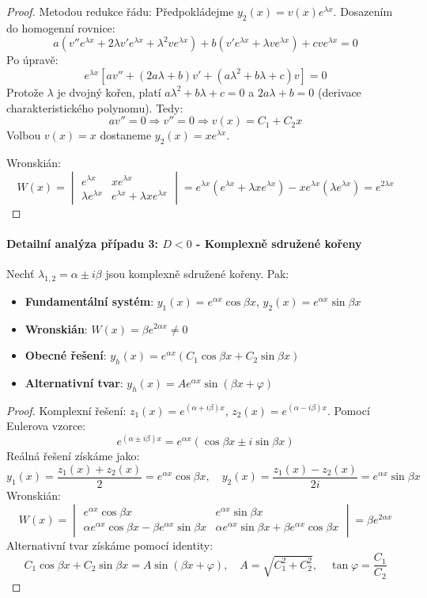 \begin{proof}
Metodou redukce řádu: Předpokládejme $y_2(x) = v(x)e^{\lambda x}$. Dosazením do homogenní rovnice:
\[
a(v''e^{\lambda x} + 2\lambda v'e^{\lambda x} + \lambda^2 ve^{\lambda x}) + b(v'e^{\lambda x} + \lambda ve^{\lambda x}) + cve^{\lambda x} = 0
\]
Po úpravě:
\[
e^{\lambda x}[av'' + (2a\lambda + b)v' + (a\lambda^2 + b\lambda + c)v] = 0
\]
Protože $\lambda$ je dvojný kořen, platí $a\lambda^2 + b\lambda + c = 0$ a $2a\lambda + b = 0$ (derivace charakteristického polynomu). Tedy:
\[
av'' = 0 \Rightarrow v'' = 0 \Rightarrow v(x) = C_1 + C_2x
\]
Volbou $v(x) = x$ dostaneme $y_2(x) = xe^{\lambda x}$.

Wronskián:
\[
W(x) = \begin{vmatrix}
e^{\lambda x} & xe^{\lambda x} \\
\lambda e^{\lambda x} & e^{\lambda x} + \lambda x e^{\lambda x}
\end{vmatrix} = e^{\lambda x}(e^{\lambda x} + \lambda x e^{\lambda x}) - xe^{\lambda x}(\lambda e^{\lambda x}) = e^{2\lambda x}
\]
\end{proof}

\paragraph{Detailní analýza případu 3: $D < 0$ - Komplexně sdružené kořeny}

\begin{theorem}
Nechť $\lambda_{1,2} = \alpha \pm i\beta$ jsou komplexně sdružené kořeny. Pak:
\begin{itemize}
\item \textbf{Fundamentální systém}: $y_1(x) = e^{\alpha x}\cos\beta x$, $y_2(x) = e^{\alpha x}\sin\beta x$
\item \textbf{Wronskián}: $W(x) = \beta e^{2\alpha x} \neq 0$
\item \textbf{Obecné řešení}: $y_h(x) = e^{\alpha x}(C_1 \cos\beta x + C_2 \sin\beta x)$
\item \textbf{Alternativní tvar}: $y_h(x) = Ae^{\alpha x}\sin(\beta x + \varphi)$
\end{itemize}
\end{theorem}

\begin{proof}
Komplexní řešení: $z_1(x) = e^{(\alpha + i\beta)x}$, $z_2(x) = e^{(\alpha - i\beta)x}$. Pomocí Eulerova vzorce:
\[
e^{(\alpha \pm i\beta)x} = e^{\alpha x}(\cos\beta x \pm i\sin\beta x)
\]
Reálná řešení získáme jako:
\[
y_1(x) = \frac{z_1(x) + z_2(x)}{2} = e^{\alpha x}\cos\beta x, \quad y_2(x) = \frac{z_1(x) - z_2(x)}{2i} = e^{\alpha x}\sin\beta x
\]
Wronskián:
\[
W(x) = \begin{vmatrix}
e^{\alpha x}\cos\beta x & e^{\alpha x}\sin\beta x \\
\alpha e^{\alpha x}\cos\beta x - \beta e^{\alpha x}\sin\beta x & \alpha e^{\alpha x}\sin\beta x + \beta e^{\alpha x}\cos\beta x
\end{vmatrix} = \beta e^{2\alpha x}
\]
Alternativní tvar získáme pomocí identity:
\[
C_1\cos\beta x + C_2\sin\beta x = A\sin(\beta x + \varphi), \quad A = \sqrt{C_1^2 + C_2^2}, \quad \tan\varphi = \frac{C_1}{C_2}
\]
\end{proof}

